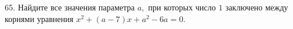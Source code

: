 65. Найдите все значения параметра $a,$ при которых число $1$ заключено между корнями уравнения $x^2+(a-7)x+a^2-6a=0.$\\
